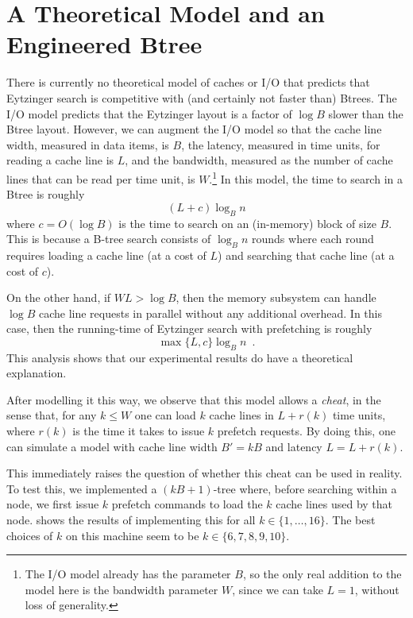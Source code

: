 \documentclass{patmorin}
\begin{document}
\section{A Theoretical Model and an Engineered Btree}

There is currently no theoretical model of caches or I/O that predicts
that Eytzinger search is competitive with (and certainly not faster than)
Btrees.  The I/O model \cite{aggarwal.vitter:input} predicts that the
Eytzinger layout is a factor of $\log B$ slower than the Btree layout.
However, we can augment the I/O model so that the cache line width,
measured in data items, is $B$, the latency, measured in time units, for
reading a cache line is $L$, and the bandwidth, measured as the number
of cache lines that can be read per time unit, is $W$.\footnote{The I/O
model already has the parameter $B$, so the only real addition to the
model here is the bandwidth parameter $W$, since we can take $L=1$,
without loss of generality.}  In this model, the time to search in a
Btree is roughly
\[
     (L+c)\log_B n
\]
where $c=O(\log B)$ is the time to search on an (in-memory) block
of size $B$.  This is because a B-tree search consists of $\log_B n$
rounds where each round requires loading a cache line (at a cost of $L$)
and searching that cache line (at a cost of $c$).

On the other hand, if $WL > \log B$, then the memory subsystem can
handle $\log B$ cache line requests in parallel without any additional
overhead. In this case, then the running-time of Eytzinger search with
prefetching is roughly
\[
    \max\{L,c\}\log_B n \enspace .
\]
This analysis shows that our experimental results do
have a theoretical explanation.

After modelling it this way, we observe that this model allows a
\emph{cheat}, in the sense that, for any $k\le W$ one can load $k$
cache lines in $L+r(k)$ time units, where $r(k)$ is the time it takes
to issue $k$ prefetch requests.  By doing this, one can simulate a model
with cache line width $B'=kB$ and latency $L=L+r(k)$.  

This immediately raises the question of whether this cheat can be used
in reality.  To test this, we implemented a $(kB+1)$-tree where, before
searching within a node, we first issue $k$ prefetch commands to load the
$k$ cache lines used by that node.   shows the results of
implementing this for all $k\in\{1,\ldots,16\}$. The best choices of $k$ 
on this machine seem to be $k\in\{6,7,8,9,10\}$.
\end{document}
